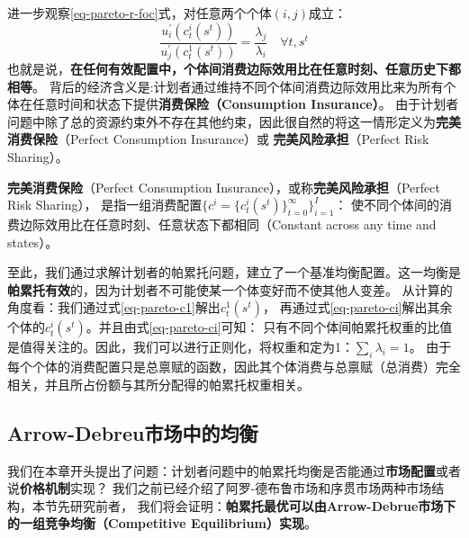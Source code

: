 进一步观察\ref{eq-pareto-r-foc}式，对任意两个个体$(i,j)$成立：
\begin{equation*}
    \frac{u_i^{\prime}\left(c_t^i\left(s^t\right)\right)}{u_j^{\prime}\left(c_t^1\left(s^t\right)\right)}=\frac{\lambda_j}{\lambda_i}
        \quad \forall t, s^t
\end{equation*}
也就是说，\textbf{在任何有效配置中，个体间消费边际效用比在任意时刻、任意历史下都相等}。
背后的经济含义是:计划者通过维持不同个体间消费边际效用比来为所有个体在任意时间和状态下提供\textbf{消费保险（Consumption Insurance）}。
由于计划者问题中除了总的资源约束外不存在其他约束，因此很自然的将这一情形定义为\textbf{完美消费保险}（Perfect Consumption Insurance）或
\textbf{完美风险承担}（Perfect Risk Sharing）。

\begin{definition}  \label{def-perfect-c-insurance}
    \textbf{完美消费保险}（Perfect Consumption Insurance），或称\textbf{完美风险承担}（Perfect Risk Sharing），
    是指一组消费配置$\{c^i=\{c_t^i\left(s^t\right)\}_{t=0}^{\infty}\}_{i=1}^{I}$：
    使不同个体间的消费边际效用比在任意时刻、任意状态下都相同（Constant across any time and states）。
\end{definition}

至此，我们通过求解计划者的帕累托问题，建立了一个基准均衡配置。这一均衡是\textbf{帕累托有效}的，因为计划者不可能使某一个体变好而不使其他人变差。
从计算的角度看：我们通过式\ref{eq-pareto-c1}解出$c_t^1\left(s^t\right)$，
再通过式\ref{eq-pareto-ci}解出其余个体的$c_t^i\left(s^t\right)$。并且由式\ref{eq-pareto-ci}可知：
只有不同个体间帕累托权重的比值是值得关注的。因此，我们可以进行正则化，将权重和定为1：$\sum_{i}\lambda_i = 1$。
由于每个个体的消费配置只是总禀赋的函数，因此其个体消费与总禀赋（总消费）完全相关，并且所占份额与其所分配得的帕累托权重相关。


\subsection{Arrow-Debreu市场中的均衡}

我们在本章开头提出了问题：计划者问题中的帕累托均衡是否能通过\textbf{市场配置}或者说\textbf{价格机制}实现？
我们之前已经介绍了阿罗-德布鲁市场和序贯市场两种市场结构，本节先研究前者，
我们将会证明：\textbf{帕累托最优可以由Arrow-Debrue市场下的一组竞争均衡（Competitive Equilibrium）实现}。

